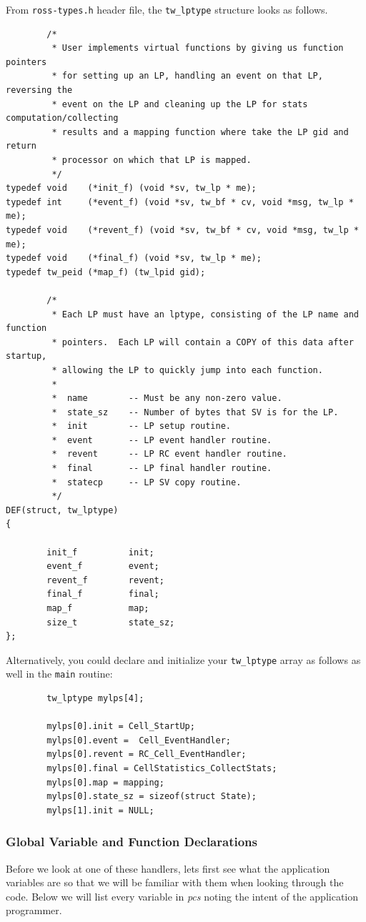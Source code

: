 \documentclass[12pt]{article}
\begin{document}
From {\tt ross-types.h} header file, the {\tt tw\_lptype} structure
looks as follows.

\begin{verbatim}
        /*
         * User implements virtual functions by giving us function pointers
         * for setting up an LP, handling an event on that LP, reversing the
         * event on the LP and cleaning up the LP for stats computation/collecting
         * results and a mapping function where take the LP gid and return 
         * processor on which that LP is mapped.
         */
typedef void    (*init_f) (void *sv, tw_lp * me);
typedef int     (*event_f) (void *sv, tw_bf * cv, void *msg, tw_lp * me);
typedef void    (*revent_f) (void *sv, tw_bf * cv, void *msg, tw_lp * me);
typedef void    (*final_f) (void *sv, tw_lp * me);
typedef tw_peid (*map_f) (tw_lpid gid);

        /*
         * Each LP must have an lptype, consisting of the LP name and function
         * pointers.  Each LP will contain a COPY of this data after startup,
         * allowing the LP to quickly jump into each function.
         *
         *  name        -- Must be any non-zero value.
         *  state_sz    -- Number of bytes that SV is for the LP.
         *  init        -- LP setup routine.
         *  event       -- LP event handler routine.
         *  revent      -- LP RC event handler routine.
         *  final       -- LP final handler routine.
         *  statecp     -- LP SV copy routine.
         */
DEF(struct, tw_lptype)
{

        init_f          init;
        event_f         event;
        revent_f        revent;
        final_f         final;
        map_f           map;
        size_t          state_sz;
};
\end{verbatim}

Alternatively, you could declare and initialize your {\tt tw\_lptype}
array as follows as well in the {\tt main} routine:

\begin{verbatim}
        tw_lptype mylps[4];

        mylps[0].init = Cell_StartUp;
        mylps[0].event =  Cell_EventHandler;
        mylps[0].revent = RC_Cell_EventHandler;
        mylps[0].final = CellStatistics_CollectStats;
        mylps[0].map = mapping;
        mylps[0].state_sz = sizeof(struct State);
        mylps[1].init = NULL;
\end{verbatim}

\subsubsection{ Global Variable and Function Declarations}
Before we look at one of these handlers, lets first see what the application
variables are so that we will be familiar with them when looking through the
code.  Below we will list every variable in {\em pcs} noting the intent of the
application programmer.
\end{document}
